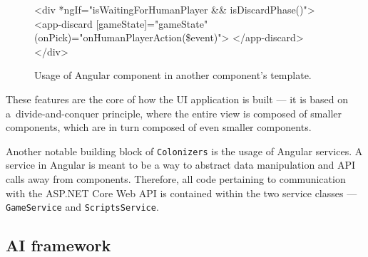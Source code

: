 \begin{figure}[h!]
\begin{code}[commandchars=\\\{\},codes={\catcode`\$=3\catcode`\^=7\catcode`\_=8}]
<div *ngIf="isWaitingForHumanPlayer && isDiscardPhase()">
    <app-discard [gameState]="gameState"
                 (onPick)="onHumanPlayerAction(\$event)">
    </app-discard>
</div>
\end{code}
\caption{Usage of Angular component in another component's template.}\label{dd:componentref}
\end{figure}

These features are the core of how the UI application is built --- it is based on
a~divide-and-conquer principle, where the entire view is composed of smaller components,
which are in turn composed of even smaller components.

Another notable building block of \texttt{Colonizers} is the usage of Angular
services. A service in Angular is meant to be a way to abstract data manipulation
and API calls away from components. Therefore, all code pertaining to
communication with the ASP.NET Core Web API is contained within
the two service classes --- \texttt{GameService} and \texttt{ScriptsService}.

\subsection{AI framework}

